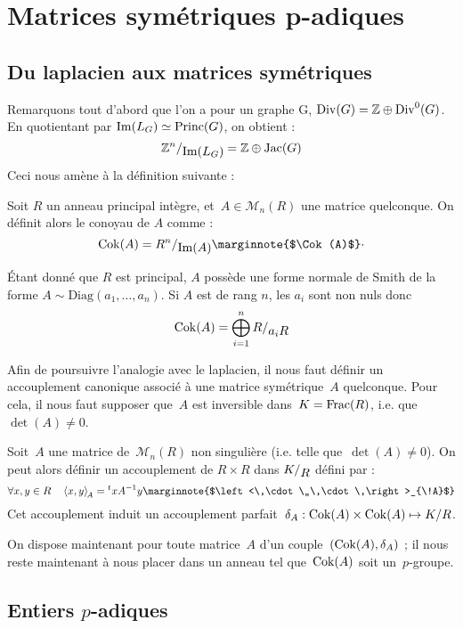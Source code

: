 \section{Matrices symétriques p-adiques}
\subsection{Du laplacien aux matrices symétriques}

Remarquons tout d'abord que l'on a pour un graphe G, $\operatorname{Div}(G) = \mathbb{Z} \oplus \operatorname{Div}^0(G)$. En quotientant par $\operatorname{Im}(L_G) \simeq \operatorname{Princ}(G)$, on obtient : 
\[ 
	\quotient{\mathbb{Z}^n}{\Im(L_G)} = \mathbb{Z} \oplus \Jac(G) 
\]
Ceci nous amène à la définition suivante : 
\begin{defi}
Soit $R$ un anneau principal intègre, et~$A\in\mathcal{M}_n(R)$ une matrice quelconque.
On définit alors le conoyau de $A$ comme : 
\[\Cok(A) = \quotient{R^n}{\Im(A)} \text{\marginnote{$\Cok(A)$}}\cdot\]
\end{defi}

\begin{rem}
\'Etant donné que $R$ est principal, $A$ possède une forme normale de Smith de la forme $A \sim \text{Diag}(a_1,\dots,a_n)$. Si $A$ est de rang $n$, les $a_i$ sont non nuls donc 
\[\Cok(A) = \bigoplus_{i=1}^n{\quotient{R}{a_iR}}\]
\end{rem}

Afin de poursuivre l'analogie avec le laplacien, il nous faut définir un accouplement canonique associé à une matrice symétrique~$A$ quelconque. Pour cela, il nous faut supposer que~$A$ est inversible dans~$K = \operatorname{Frac}(R)$, i.e. que~$\det(A)\neq0$.
\begin{defi}
Soit~$A$ une matrice de~$\mathcal{M}_n(R)$ non singulière (i.e. telle que~$\det(A)\neq 0$).
On peut alors définir un accouplement de $R\times R$ dans $\quotient{K}{R}$ défini par :
\[ \forall x,y\in R\quad \left<x,y\right>_{\!A} = {}^txA^{-1}y \text{\marginnote{$\left<\,\cdot\,,\,\cdot\,\right>_{\!A}$}}\]
Cet accouplement induit un accouplement parfait~$\delta_A : \operatorname{Cok}(A)\times\operatorname{Cok}(A) \mapsto K/R$.
\end{defi}

On dispose maintenant pour toute matrice~$A$ d'un couple~$(\operatorname{Cok}(A), \delta_A)$ ; il nous reste maintenant à nous placer dans un anneau tel que~$\operatorname{Cok}(A)$ soit un~$p$-groupe.

\subsection{Entiers $p$-adiques}

